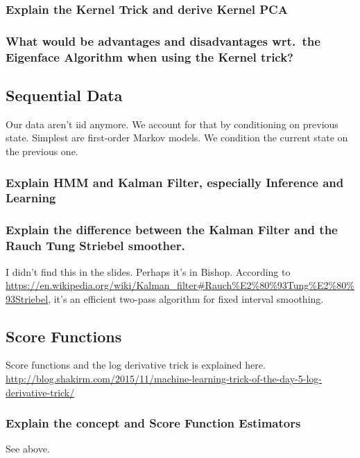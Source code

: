 \documentclass{article}
\begin{document}
\subsubsection{Explain the Kernel Trick and derive Kernel PCA}

\subsubsection{What would be advantages and disadvantages wrt.~the Eigenface Algorithm when using the Kernel trick?}







\subsection{Sequential Data}
Our data aren't iid anymore. We account for that by conditioning on previous state. Simplest are first-order Markov models. We condition the current state on the previous one. 

\subsubsection{Explain HMM and Kalman Filter, especially Inference and Learning}

\subsubsection{Explain the difference between the Kalman Filter and the Rauch Tung Striebel smoother.}
I didn't find this in the slides. Perhaps it's in Bishop. According to  \url{https://en.wikipedia.org/wiki/Kalman_filter#Rauch\%E2\%80\%93Tung\%E2\%80\%93Striebel}, it's an efficient two-pass algorithm for fixed interval smoothing.


\subsection{Score Functions}
Score functions and the log derivative trick is explained here.
\url{http://blog.shakirm.com/2015/11/machine-learning-trick-of-the-day-5-log-derivative-trick/}

\subsubsection{Explain the concept and Score Function Estimators}
See above.
\end{document}
